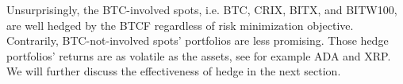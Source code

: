 
Unsurprisingly, the BTC-involved spots, i.e. BTC, CRIX, BITX, and BITW100, are well hedged by the BTCF regardless of risk minimization objective.
Contrarily, BTC-not-involved spots' portfolios are less promising.
Those hedge portfolios' returns are as volatile as the assets, see for example ADA and XRP.
We will further discuss the effectiveness of hedge in the next section. %

